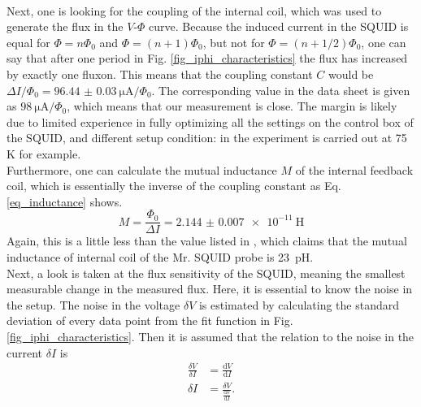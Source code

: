 \documentclass[a4paper,10pt]{article}
\newcommand{\dif}{\mathrm{d}}
\begin{document}
\\ %
Next, one is looking for the coupling of the internal coil, which was used to generate the flux in the $V$-$\Phi$ curve. Because the induced current in the SQUID is equal for $\Phi = n \Phi_0$ and $\Phi = (n + 1) \Phi_0$, but not for $\Phi = (n + 1/2) \Phi_0$, one can say that after one period in Fig. \ref{fig_iphi_characteristics} the flux has increased by exactly one fluxon. This means that the coupling constant $C$ would be $\Delta I / \Phi_0 = \SI{96.44(3)}{\micro \ampere} / \Phi_0$. The corresponding value in the data sheet \cite{datasheet} is given as $\SI{98}{\micro \ampere} / \Phi_0$, which means that our measurement is close. The margin is likely due to limited experience in fully optimizing all the settings on the control box of the SQUID, and different setup condition: in \cite{datasheet} the experiment is carried out at 75 K for example.
\\
Furthermore, one can calculate the mutual inductance $M$ of the internal feedback coil, which is essentially the inverse of the coupling constant as Eq. \ref{eq_inductance} shows. 
\begin{equation}
    \label{eq_inductance}
    M = \frac{\Phi_0}{\Delta I} = \SI{2.144(7)e-11}{\henry}
\end{equation}
Again, this is a little less than the value listed in \cite{skriptum}, which claims that the mutual inductance of internal coil of the Mr. SQUID probe is \SI{23}{\pico \henry}. \\
Next, a look is taken at the flux sensitivity of the SQUID, meaning the smallest measurable change in the measured flux. Here, it is essential to know the noise in the setup. The noise in the voltage $\delta V$ is estimated by calculating the standard deviation of every data point from the fit function in Fig. \ref{fig_iphi_characteristics}. Then it is assumed that the relation to the noise in the current $\delta I$ is 
\begin{equation}
    \begin{split}
        \label{eq_noise}
        \frac{\delta V}{\delta I} &= \frac{\dif V}{\dif I} \\
        \delta I &= \frac{\delta V}{\frac{\dif V}{\dif I}}. 
    \end{split}
\end{equation}
\end{document}
